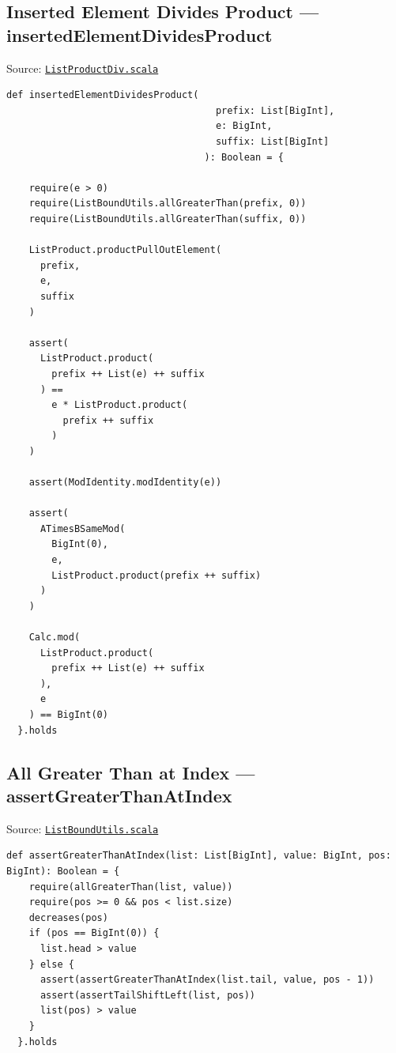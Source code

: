 \subsection{Inserted Element Divides Product --- insertedElementDividesProduct}

Source:
\href{https://github.com/thiagomata/prime-numbers/blob/list-article-v1.0.0/src/main/scala/v1/chapter3/list/properties/ListProductDiv.scala}{\texttt{ListProductDiv.scala}}

\begin{lstlisting}[style=scala]
  def insertedElementDividesProduct(
                                     prefix: List[BigInt],
                                     e: BigInt,
                                     suffix: List[BigInt]
                                   ): Boolean = {

    require(e > 0)
    require(ListBoundUtils.allGreaterThan(prefix, 0))
    require(ListBoundUtils.allGreaterThan(suffix, 0))

    ListProduct.productPullOutElement(
      prefix,
      e,
      suffix
    )

    assert(
      ListProduct.product(
        prefix ++ List(e) ++ suffix
      ) ==
        e * ListProduct.product(
          prefix ++ suffix
        )
    )

    assert(ModIdentity.modIdentity(e))

    assert(
      ATimesBSameMod(
        BigInt(0),
        e,
        ListProduct.product(prefix ++ suffix)
      )
    )

    Calc.mod(
      ListProduct.product(
        prefix ++ List(e) ++ suffix
      ),
      e
    ) == BigInt(0)
  }.holds
\end{lstlisting}

\subsection{All Greater Than at Index --- assertGreaterThanAtIndex}

Source:
\href{https://github.com/thiagomata/prime-numbers/blob/list-article-v1.0.0/src/main/scala/v1/chapter3/list/ListBoundUtils.scala}{\texttt{ListBoundUtils.scala}}

\begin{lstlisting}[style=scala]
  def assertGreaterThanAtIndex(list: List[BigInt], value: BigInt, pos: BigInt): Boolean = {
    require(allGreaterThan(list, value))
    require(pos >= 0 && pos < list.size)
    decreases(pos)
    if (pos == BigInt(0)) {
      list.head > value
    } else {
      assert(assertGreaterThanAtIndex(list.tail, value, pos - 1))
      assert(assertTailShiftLeft(list, pos))
      list(pos) > value
    }
  }.holds
\end{lstlisting}

